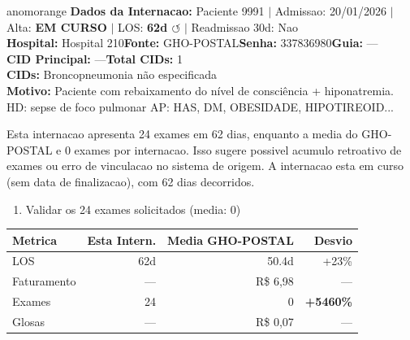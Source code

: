 \documentclass[a4paper,10pt]{article}
\begin{document}
\begin{anomalycard}[Internacao 9292 | GHO-POSTAL | ALTO (z=4.43)]{anomorange}
\textbf{Dados da Internacao:} Paciente 9991 $\mid$ Admissao: 20/01/2026 $\mid$ Alta: \textcolor{anomorange}{\textbf{EM CURSO}} $\mid$ LOS: \textbf{62d \textcolor{anomorange}{$\circlearrowleft$}} $\mid$ Readmissao 30d: Nao\\
\textbf{Hospital:} Hospital 210\quad\textbf{Fonte:} GHO-POSTAL\quad\textbf{Senha:} 337836980\quad\textbf{Guia:} ---\\
\textbf{CID Principal:} {\small ---}\quad\textbf{Total CIDs:} 1\\

\textbf{CIDs:} {\scriptsize Broncopneumonia não especificada}\\

\textbf{Motivo:} {\scriptsize Paciente com rebaixamento do nível de consciência + hiponatremia. HD: sepse de foco pulmonar AP: HAS, DM, OBESIDADE, HIPOTIREOID...}\\

\vspace{2pt}\begin{tcolorbox}[colback=severityred!20,colframe=anomorange,title={\textbf{Interpretacao de Negocio}},fonttitle=\bfseries\small,left=4pt,right=4pt,top=3pt,bottom=3pt]
{\small Esta internacao apresenta 24 exames em 62 dias, enquanto a media do GHO-POSTAL e 0 exames por internacao. Isso sugere possivel acumulo retroativo de exames ou erro de vinculacao no sistema de origem. A internacao esta em curso (sem data de finalizacao), com 62 dias decorridos.}
\end{tcolorbox}
\begin{tcolorbox}[colback=severityyellow!30,colframe=anomorange,title={\textbf{Recomendacoes Especificas}},fonttitle=\bfseries\small,left=4pt,right=4pt,top=3pt,bottom=3pt]
\begin{enumerate}[nosep,leftmargin=16pt]
\item {\small Validar os 24 exames solicitados (media: 0)}
\end{enumerate}
\end{tcolorbox}
\begin{center}\begin{tabular}{l r r r}\toprule\textbf{Metrica} & \textbf{Esta Intern.} & \textbf{Media GHO-POSTAL} & \textbf{Desvio} \\\midrule
LOS & 62d & 50.4d & +23\% \\
Faturamento & --- & R\$ 6,98 & --- \\
Exames & 24 & 0 & \textcolor{anomred}{\textbf{+5460\%}} \\
Glosas & --- & R\$ 0,07 & --- \\
\bottomrule\end{tabular}\end{center}


\end{anomalycard}
\end{document}
